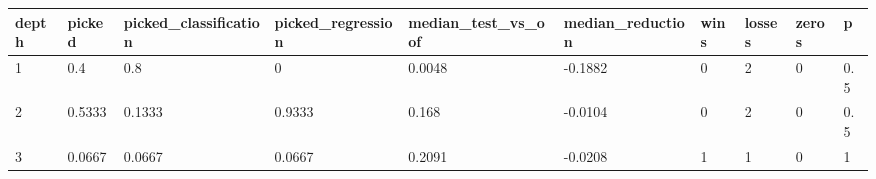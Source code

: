 \begin{tabular}{llllllllll}
\toprule
depth & picked & picked\_classification & picked\_regression & median\_test\_vs\_oof & median\_reduction & wins & losses & zeros & p \\
\midrule
1 & 0.4 & 0.8 & 0 & 0.0048 & -0.1882 & 0 & 2 & 0 & 0.5 \\
2 & 0.5333 & 0.1333 & 0.9333 & 0.168 & -0.0104 & 0 & 2 & 0 & 0.5 \\
3 & 0.0667 & 0.0667 & 0.0667 & 0.2091 & -0.0208 & 1 & 1 & 0 & 1 \\
\bottomrule
\end{tabular}
